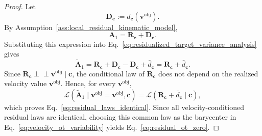 \documentclass[10pt,twocolumn,letterpaper]{article}
\begin{document}
\begin{proof}
Let
\[
    \mathbf D_{\mathbf c}
    :=
    d_{\mathbf c}(\mathbf v^{\mathrm{obj}}).
\]
By Assumption~\ref{ass:local_residual_kinematic_model},
\[
    \mathbf A_1
    =
    \mathbf R_{\mathbf c}
    +
    \mathbf D_{\mathbf c}.
\]
Substituting this expression into
Eq.~\eqref{eq:residualized_target_variance_analysis} gives
\[
    \widetilde{\mathbf A}_1
    =
    \mathbf R_{\mathbf c}
    +
    \mathbf D_{\mathbf c}
    -
    \mathbf D_{\mathbf c}
    +
    \bar d_{\mathbf c}
    =
    \mathbf R_{\mathbf c}
    +
    \bar d_{\mathbf c}.
\]
Since
$\mathbf R_{\mathbf c}\perp\!\!\!\perp \mathbf v^{\mathrm{obj}}\mid\mathbf c$, the
conditional law of $\mathbf R_{\mathbf c}$ does not depend on the realized
velocity value $\mathbf v^{\mathrm{obj}}$. Hence, for every $\mathbf v^{\mathrm{obj}}$,
\[
    \mathcal L
    \left(
        \widetilde{\mathbf A}_1
        \mid
        \mathbf v^{\mathrm{obj}}=\mathbf v^{\mathrm{obj}},
        \mathbf c
    \right)
    =
    \mathcal L
    \left(
        \mathbf R_{\mathbf c}
        +
        \bar d_{\mathbf c}
        \mid
        \mathbf c
    \right),
\]
which proves Eq.~\eqref{eq:residual_laws_identical}. Since all
velocity-conditioned residual laws are identical, choosing this common law as
the barycenter in Eq.~\eqref{eq:velocity_ot_variability} yields
Eq.~\eqref{eq:residual_ot_zero}.


\end{proof}
\end{document}
